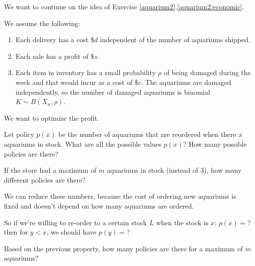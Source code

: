 \begin{slide}
\question

\begin{problem}

We want to continue on the idea of Exercise \ref{aquarium2}.\ref{aquarium2:economic}.

We assume the following:
\begin{enumerate}
	\item Each delivery has a cost \$$d$ independent of the number of aquariums shipped.
	\item Each sale has a profit of \$$s$.
	\item Each item in inventory has a small probability $\rho$ of being damaged during the week and that would incur as a cost of \$$c$. The aquariums are damaged independently, so the number of damaged aquariums is binomial $K \sim B(X_n,\rho)$.
\end{enumerate}

We want to optimize the profit.
\end{problem}

\begin{parts}
	\item Let policy $p(x)$ be the number of aquariums that are reordered when there $x$ aquariums in stock. What are all the possible values $p(x)$? How many possible policies are there?
	\item If the store had a maximum of $m$ aquariums in stock (instead of 3), how many different policies are there?
	\item We can reduce these numbers, because the cost of ordering new aquariums is fixed and doesn't depend on how many aquariums are ordered. 
		
		So if we're willing to re-order to a certain stock $L$ when  the stock is $x$: $p(x) = $?
		then for $y<x$, we should have $p(y)= $?
	
	\item Based on the previous property, how many policies are there for a maximum of $m$ aquariums?
\end{parts}

	
\end{slide}




